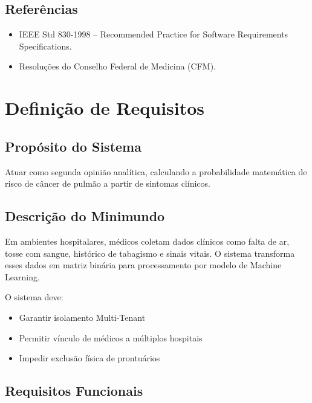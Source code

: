 \documentclass[12pt,a4paper]{article}
\begin{document}
\subsection{Referências}

\begin{itemize}
    \item IEEE Std 830-1998 – Recommended Practice for Software Requirements Specifications.
    \item Resoluções do Conselho Federal de Medicina (CFM).
\end{itemize}

\section{Definição de Requisitos}

\subsection{Propósito do Sistema}

Atuar como segunda opinião analítica, calculando a probabilidade matemática de risco de câncer de pulmão a partir de sintomas clínicos.

\subsection{Descrição do Minimundo}

Em ambientes hospitalares, médicos coletam dados clínicos como falta de ar, tosse com sangue, histórico de tabagismo e sinais vitais. O sistema transforma esses dados em matriz binária para processamento por modelo de Machine Learning.

O sistema deve:
\begin{itemize}
    \item Garantir isolamento Multi-Tenant
    \item Permitir vínculo de médicos a múltiplos hospitais
    \item Impedir exclusão física de prontuários
\end{itemize}

\subsection{Requisitos Funcionais}
\end{document}

